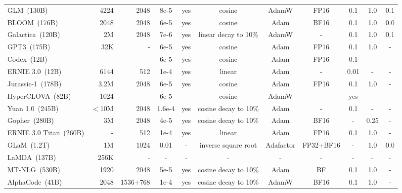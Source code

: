 \begin{table*}[tbp]
{\begin{tabular}{lrrcccccccc}
GLM~(130B) & 4224  & 2048 & 8e-5  & yes & cosine    & AdamW & FP16 & 0.1 & 1.0 & 0.1              \\

BLOOM~(176B) & 2048  & 2048 & 6e-5 & yes  & cosine    & Adam  & BF16 & 0.1 & 1.0 & 0.0              \\

Galactica~(120B) & 2M & 2048 & 7e-6 & yes & linear decay to 10\%    & AdamW  & - & 0.1  & 1.0 & 0.1              \\

GPT3~(175B) & 32K  & - & 6e-5 & yes & cosine    & Adam & FP16 & 0.1 & 1.0  & -                \\

Codex~(12B) & -  & - & 6e-5 & yes & cosine    & Adam & FP16 & 0.1 & -  & -                \\

ERNIE 3.0~(12B) & 6144  & 512 & 1e-4 & yes & linear    & Adam & - & 0.01 & -  & -                \\

Jurassic-1~(178B) & 3.2M &2048 & 6e-5 & yes & cosine & Adam & FP16 & 0.1 & 1.0 & -                \\

HyperCLOVA~(82B) & 1024  & - & 6e-5 & - & cosine    & AdamW & - & yes & -  & -                \\

Yuan 1.0~(245B) & $<$10M &2048 & 1.6e-4 & yes & cosine decay to 10\%    & Adam & -  & 0.1 & - & -                \\

Gopher~(280B) & 3M  & 2048 & 4e-5 & yes & cosine decay to 10\%    & Adam  & BF16  & -   & 0.25  & -                \\

ERNIE 3.0 Titan~(260B)  & -  & 512 & 1e-4 & yes & linear    & Adam & FP16 & 0.1 & 1.0  & -      \\

GLaM~(1.2T) & 1M &1024 & 0.01 & - & inverse square root   & Adafactor & FP32+BF16  & - & 1.0 & 0.0                \\

LaMDA~(137B) & 256K  & - & - & - & -  & - & - & - & - &-               \\

MT-NLG~(530B) & 1920  & 2048 & 5e-5 & yes & cosine decay to 10\%   & Adam & BF & 0.1 & 1.0  & - \\

AlphaCode~(41B) & 2048 &1536+768 & 1e-4 &yes& cosine decay to 10\%   & AdamW & BF16  &0.1 & 1.0 &-               \\


\end{tabular}}
\end{table*}
